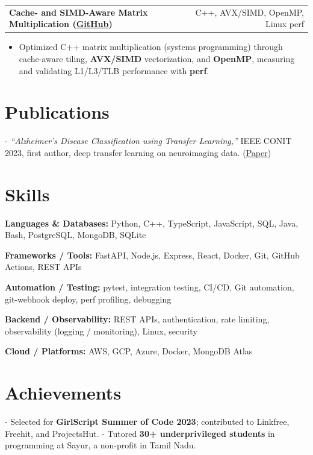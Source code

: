 \documentclass[letterpaper,11pt]{article}
\makeatletter
\newcommand{\projItem}[2]{%
  \vspace{6pt}
  \begin{tabular*}{\textwidth}{@{}l@{\extracolsep{\fill}}r@{}}
    \textbf{#1} & #2 \\
  \end{tabular*}\par\vspace{-2pt}
}
\newcommand{\skillLine}[2]{\textbf{#1:} #2\par\vspace{2pt}}
\newcommand{\inlineBlock}[1]{{\setlength{\leftskip}{0.18in}\small #1\par}}
\makeatother
\begin{document}
\projItem{Cache- and SIMD-Aware Matrix Multiplication {\normalfont\small(\href{https://github.com/Deva-1903/cs690pf}{GitHub})}}{C++, AVX/SIMD, OpenMP, Linux perf}
\begin{itemize}
  \item Optimized C++ matrix multiplication (systems programming) through cache-aware tiling, \textbf{AVX/SIMD} vectorization, and \textbf{OpenMP}, measuring and validating L1/L3/TLB performance with \textbf{perf}.
\end{itemize}

\section{Publications}
\inlineBlock{- \textit{``Alzheimer's Disease Classification using Transfer Learning,''} IEEE CONIT 2023, first author, deep transfer learning on neuroimaging data. {\normalfont\small(\href{https://ieeexplore.ieee.org/document/10205760}{Paper})}}

\section{Skills}
\skillLine{Languages \& Databases}{Python, C++, TypeScript, JavaScript, SQL, Java, Bash, PostgreSQL, MongoDB, SQLite}
\skillLine{Frameworks / Tools}{FastAPI, Node.js, Express, React, Docker, Git, GitHub Actions, REST APIs}
\skillLine{Automation / Testing}{pytest, integration testing, CI/CD, Git automation, git-webhook deploy, perf profiling, debugging}
\skillLine{Backend / Observability}{REST APIs, authentication, rate limiting, observability (logging / monitoring), Linux, security}
\skillLine{Cloud / Platforms}{AWS, GCP, Azure, Docker, MongoDB Atlas}

\section{Achievements}
\inlineBlock{- Selected for \textbf{GirlScript Summer of Code 2023}; contributed to Linkfree, Freehit, and ProjectsHut. - Tutored \textbf{30+ underprivileged students} in programming at Sayur, a non-profit in Tamil Nadu.}
\end{document}
